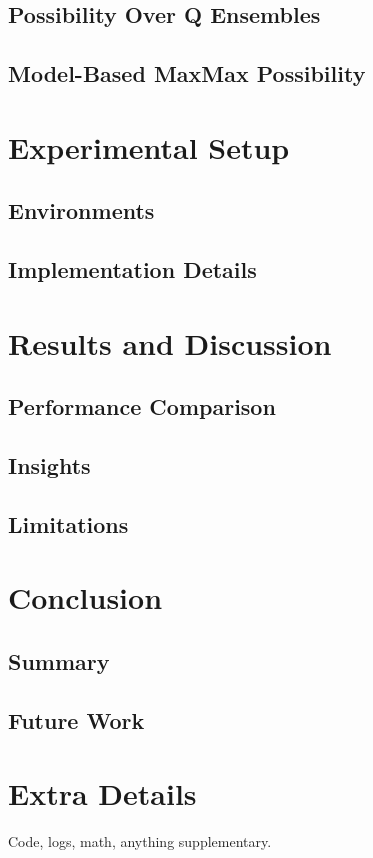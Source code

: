 \documentclass[12pt,a4paper]{report}
\begin{document}
\section{Possibility Over Q Ensembles}
\section{Model-Based MaxMax Possibility}

\chapter{Experimental Setup}
\section{Environments}
\section{Implementation Details}

\chapter{Results and Discussion}
\section{Performance Comparison}
\section{Insights}
\section{Limitations}

\chapter{Conclusion}
\section{Summary}
\section{Future Work}




\appendix
\chapter{Extra Details}
Code, logs, math, anything supplementary.
\end{document}
